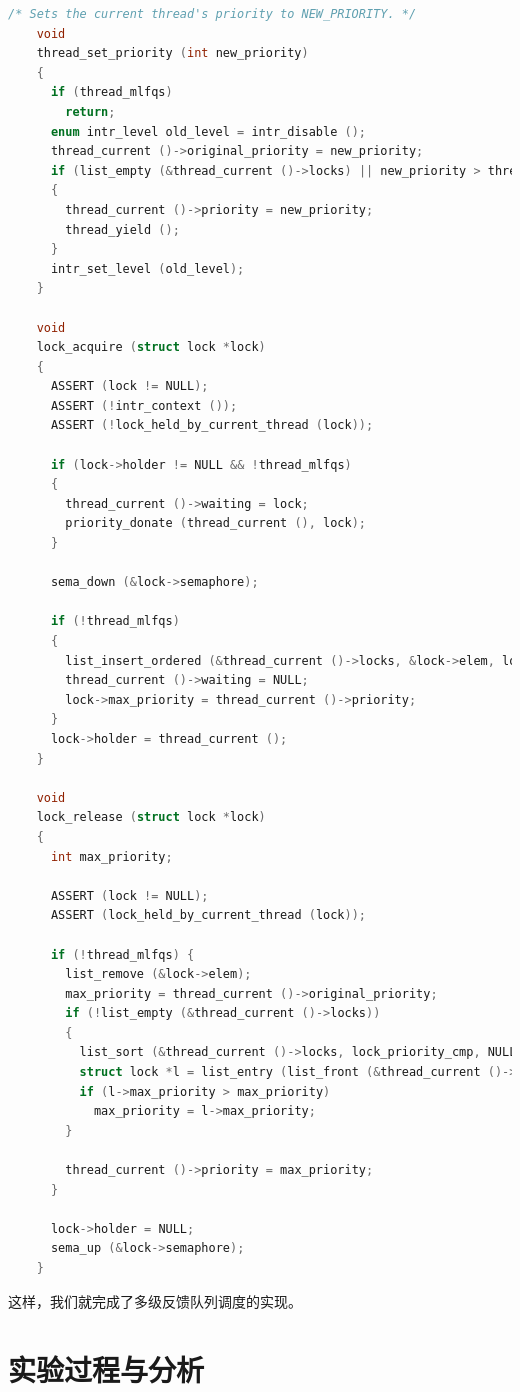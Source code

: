 \documentclass{article}
\begin{document}
\begin{lstlisting}[language=C, title=修改后的函数]
    /* Sets the current thread's priority to NEW_PRIORITY. */
    void
    thread_set_priority (int new_priority) 
    {
      if (thread_mlfqs)
        return;
      enum intr_level old_level = intr_disable ();
      thread_current ()->original_priority = new_priority;
      if (list_empty (&thread_current ()->locks) || new_priority > thread_current ()->priority)
      {
        thread_current ()->priority = new_priority;
        thread_yield ();
      }
      intr_set_level (old_level);
    }
    
    void
    lock_acquire (struct lock *lock)
    {
      ASSERT (lock != NULL);
      ASSERT (!intr_context ());
      ASSERT (!lock_held_by_current_thread (lock));

      if (lock->holder != NULL && !thread_mlfqs)
      {
        thread_current ()->waiting = lock;
        priority_donate (thread_current (), lock);
      }

      sema_down (&lock->semaphore);

      if (!thread_mlfqs)
      {
        list_insert_ordered (&thread_current ()->locks, &lock->elem, lock_priority_cmp, NULL);
        thread_current ()->waiting = NULL;
        lock->max_priority = thread_current ()->priority;
      }
      lock->holder = thread_current ();
    }

    void
    lock_release (struct lock *lock) 
    {
      int max_priority;

      ASSERT (lock != NULL);
      ASSERT (lock_held_by_current_thread (lock));

      if (!thread_mlfqs) {
        list_remove (&lock->elem);
        max_priority = thread_current ()->original_priority;
        if (!list_empty (&thread_current ()->locks))
        {
          list_sort (&thread_current ()->locks, lock_priority_cmp, NULL);
          struct lock *l = list_entry (list_front (&thread_current ()->locks), struct lock, elem);
          if (l->max_priority > max_priority)
            max_priority = l->max_priority;
        }

        thread_current ()->priority = max_priority;
      }

      lock->holder = NULL;
      sema_up (&lock->semaphore);
    }

\end{lstlisting}

这样，我们就完成了多级反馈队列调度的实现。

\section{实验过程与分析}
\end{document}
